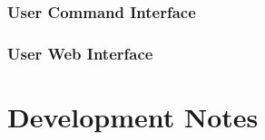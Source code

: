 \documentclass{jsbook}
\begin{document}
\subsubsection{}


\subsection{User Command Interface}

\subsubsection{}
\subsubsection{}
\subsubsection{}
\subsubsection{}
\subsubsection{}


\subsection{User Web Interface}

\subsubsection{}
\subsubsection{}
\subsubsection{}
\subsubsection{}



\chapter{Development Notes}
\end{document}
